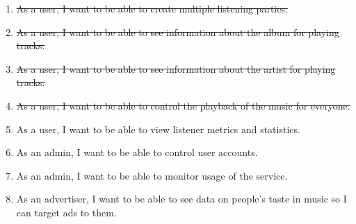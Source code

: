 \documentclass[11pt]{report}
\begin{document}
\begin{enumerate}
    \item \st{As a user, I want to be able to create multiple listening parties.}
    
    \item \st{As a user, I want to be able to see information about the album for playing tracks.}
    
    \item \st{As a user, I want to be able to see information about the artist for playing tracks.}

    \item \st{As a user, I want to be able to control the playback of the music for everyone.}
    
    \item As a user, I want to be able to view listener metrics and statistics.
    
    \item As an admin, I want to be able to control user accounts.
    
    \item As an admin, I want to be able to monitor usage of the service.
    
    \item As an advertiser, I want to be able to see data on people's taste in music so I can target ads to them.

\end{enumerate}
\end{document}
